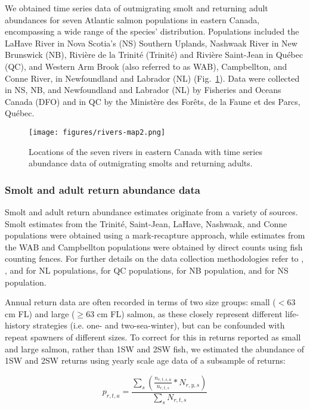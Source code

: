 \documentclass[12pt]{article}
\begin{document}
We obtained time series data of outmigrating smolt and returning adult
abundances for seven Atlantic salmon populations in eastern Canada, encompassing a
wide range of the species' distribution. 
Populations included the LaHave River in Nova Scotia's (NS) Southern Uplands, 
Nashwaak River in New Brunswick (NB), Rivi\`{e}re de la Trinit\'{e} (Trinit\'{e}) and
Rivi\`{e}re Saint-Jean in Qu\'{e}bec (QC), and Western Arm Brook (also referred to as WAB), 
Campbellton, and Conne River, in Newfoundland and Labrador (NL) (Fig.~\ref{fig:map}). 
Data were collected in NS, NB, and Newfoundland
and Labrador (NL) by Fisheries and Oceans Canada (DFO) and in QC
by the Minist\`{e}re des For\^{e}ts, de la Faune et des Parcs, Qu\'{e}bec.

\begin{figure}[htbp] \centering
    \texttt{[image: figures/rivers-map2.png]}
    \caption{Locations of the seven rivers in eastern Canada with time series abundance data of outmigrating smolts and 
    returning adults.} \label{fig:map} 
\end{figure}

\subsubsection*{Smolt and adult return abundance data}

Smolt and adult return abundance estimates originate from a variety of
sources. Smolt estimates from the Trinit\'{e}, Saint-Jean, LaHave, Nashwaak,
and Conne populations were obtained using a mark-recapture approach, while
estimates from the WAB and Campbellton populations were obtained by direct
counts using fish counting fences.
For further details on the data collection methodologies refer to 
\citet{Dempson1991}, \citet{Schwarz1994}, and \citet{Venoitt2018} for NL populations, 
\citet{April2018}  for QC populations,
\citet{Jones2014} for NB population,
and \citet{Gibson2009} for NS population. 

Annual return data are often recorded in terms of two size groups: small ($< 63$ cm
FL) and large ($\geq 63$ cm FL) salmon, as these closely represent different
life-history strategies (i.e. one- and two-sea-winter), but can be confounded with repeat
spawners of different sizes. To correct for this in returns 
reported as small and large salmon, rather than 1SW and 2SW fish, we estimated the abundance
of 1SW and 2SW returns using yearly scale age data of a subsample of returns:

\begin{equation}
    p_{r,t,a} = \frac{\sum_{s}{(\frac{n_{r,t,s,a}}{n_{r,t,s}} * N_{r,y,s})}}{\sum_{s}{N_{r,t,s}}}
\end{equation}
\end{document}
